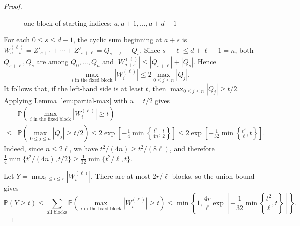 \documentclass[10pt,a4paper]{amsart}
\numberwithin{equation}{section}
\begin{document}
\begin{proof}
\begin{figure}[htbp]
\caption{one block of starting indices: $a,a+1,\ldots,a+d-1$}
\label{fig:cyclic-block}
\end{figure}




For each $0\le s\le d-1$, the cyclic sum beginning at $a+s$ is
$W_{a+s}^{(\ell)}=Z'_{s+1}+\cdots+Z'_{s+\ell}=Q_{s+\ell}-Q_s$.
Since $s+\ell\le d+\ell-1=n$, both  $Q_{s+\ell}, Q_s$ are among
$Q_0,\ldots,Q_n$ and 
$|W_{a+s}^{(\ell)}|\le |Q_{s+\ell}|+|Q_s|$. Hence
$$ \max_{i\text{ in the fixed block}}|W_i^{(\ell)}|
 \le2\max_{0\le j\le n}|Q_j|.$$
It follows that, if the left-hand side is at least $t$, then
$\max_{0\le j\le n}|Q_j|\ge t/2$.  
Applying Lemma \ref{lem:partial-max} with $u=t/2$ gives
\begin{align*}
   &\mathbb{P}\left(\max_{i\text{ in the fixed block}}|W_i^{(\ell)}|\ge t\right)\\
   \le &\mathbb{P}\left(\max_{0\le j\le n}|Q_j|
   \ge t/2\right)
 \le2\exp\left[-\frac14\min\left\{\frac{t^2}{4n},\frac t2\right\}\right]
 \le2\exp\left[-\frac1{32}\min\left\{\frac{t^2}{\ell},t\right\}\right]. 
\end{align*}
Indeed, since $n\le2\ell$, we have $t^2/(4n)\ge t^2/(8\ell)$, and therefore
$\frac14\min\{t^2/(4n),t/2\}\ge\frac1{32}\min\{t^2/\ell,t\}$.

Let $Y=\max_{1\le i\le r}|W_i^{(\ell)}|$.  There are at most $2r/\ell$ blocks, so the union bound gives
\begin{equation}\label{eq:scan-tail}
 \mathbb{P}(Y\ge t)\le \sum_{\text{all blocks}}\mathbb{P}\left(\max_{i\text{ in the fixed block}}|W_i^{(\ell)}|\ge t\right)
 \le\min\left\{1,\frac{4r}{\ell}
 \exp\left[-\frac1{32}\min\left\{\frac{t^2}{\ell},t\right\}\right]\right\}.
\end{equation}


\end{proof}
\end{document}
